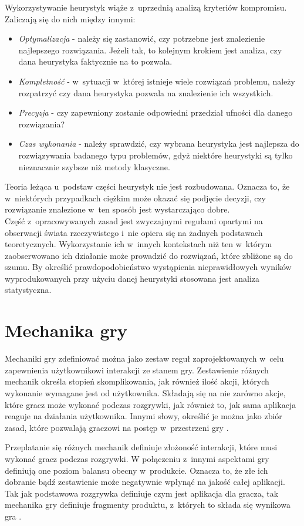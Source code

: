 \documentclass[a4paper,12pt,numbers=noenddot]{report}
\begin{document}
Wykorzystywanie heurystyk wiąże z~uprzednią analizą kryteriów kompromisu. Zaliczają się do nich między innymi:
\begin{itemize}
\item
\textit{Optymalizacja} - należy się zastanowić, czy potrzebne jest znalezienie najlepszego rozwiązania. Jeżeli tak, to kolejnym krokiem jest analiza, czy dana heurystyka faktycznie na to pozwala.
\item
\textit{Kompletność} - w~sytuacji w~której istnieje wiele rozwiązań problemu, należy rozpatrzyć czy dana heurystyka pozwala na znalezienie ich wszystkich.
\item
\textit{Precyzja} - czy zapewniony zostanie odpowiedni przedział ufności dla danego rozwiązania?
\item
\textit{Czas wykonania} - należy sprawdzić, czy wybrana heurystyka jest najlepsza do rozwiązywania badanego typu problemów, gdyż niektóre heurystyki są tylko nieznacznie szybsze niż metody klasyczne.
\end{itemize}

Teoria leżąca u~podstaw części heurystyk nie jest rozbudowana. Oznacza to, że w~niektórych przypadkach ciężkim może okazać się podjęcie decyzji, czy rozwiązanie znalezione w~ten sposób jest wystarczająco dobre.\\
Część z~opracowywanych zasad jest zwyczajnymi regułami opartymi na obserwacji świata rzeczywistego i~nie opiera się na żadnych podstawach teoretycznych. Wykorzystanie ich w~innych kontekstach niż ten w~którym zaobserwowano ich działanie może prowadzić do rozwiązań, które zbliżone są do szumu.
By określić prawdopodobieństwo wystąpienia nieprawidłowych wyników wyprodukowanych przy użyciu danej heurystyki stosowana jest analiza statystyczna.

\section{Mechanika gry}
Mechaniki gry zdefiniować można jako zestaw reguł zaprojektowanych w~celu zapewnienia użytkownikowi interakcji ze stanem gry. Zestawienie różnych mechanik określa stopień skomplikowania, jak również ilość akcji, których wykonanie wymagane jest od użytkownika. Składają się na nie zarówno akcje, które gracz może wykonać podczas rozgrywki, jak również to, jak sama aplikacja reaguje na działania użytkownika. Innymi słowy, określić je można jako zbiór zasad, które pozwalają graczowi na postęp w~przestrzeni gry \cite{online_GameMechanics}.

Przeplatanie się różnych mechanik definiuje złożoność interakcji, które musi wykonać gracz podczas rozgrywki. W połączeniu z~innymi aspektami gry definiują one poziom balansu obecny w~produkcie. Oznacza to, że złe ich dobranie bądź zestawienie może negatywnie wpłynąć na jakość całej aplikacji. Tak jak podstawowa rozgrywka definiuje czym jest aplikacja dla gracza, tak mechanika gry definiuje fragmenty produktu, z~których to składa się wynikowa gra \cite{art_GameMechanics}. 
\end{document}
